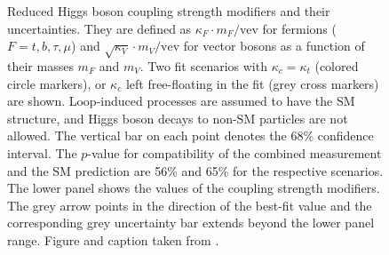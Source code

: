 \begin{figure}
    \caption[Reduced Higgs boson coupling strength modifiers and their uncertainties.]{
      Reduced Higgs boson coupling strength modifiers and their uncertainties. They are defined as $\kappa_F \cdot m_F / \text{vev}$ for fermions
  ($F=t,b,\tau,\mu$) and $\sqrt{\kappa_V}\cdot m_V/\text{vev}$ for vector bosons as a
  function of their masses $m_F$ and $m_V$. Two fit scenarios with $\kappa_c =
  \kappa_t$ (colored circle markers), or $\kappa_c$ left free-floating in the fit (grey
  cross markers) are shown. Loop-induced processes are assumed to have the SM structure, and Higgs boson decays to non-SM particles are not allowed. The vertical bar on each point denotes the 68\% confidence interval. The $p$-value for compatibility of the combined measurement and the SM prediction are 56\% and 65\% for the respective scenarios. The lower panel shows the values of the coupling strength modifiers. The grey arrow points in the direction of the best-fit value and the corresponding grey uncertainty bar extends beyond the lower panel range. Figure and caption taken from .}
    \label{fig:h-couplings}
\end{figure}